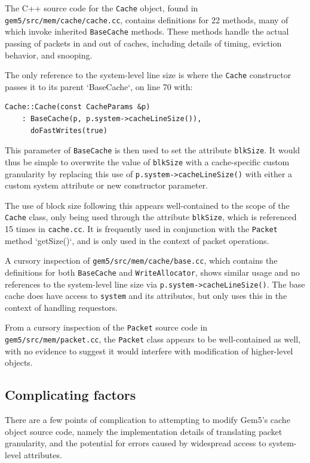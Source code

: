 \documentclass[12pt,twoside]{reedthesis}
\begin{document}
	The C++ source code for the \verb`Cache` object, found in \verb`gem5/src/mem/cache/cache.cc`, contains definitions for 22 methods, many of which invoke inherited \verb`BaseCache` methods. These methods handle the actual passing of packets in and out of caches, including details of timing, eviction behavior, and snooping.

	The only reference to the system-level line size is where the \verb`Cache` constructor passes it to its parent `BaseCache`, on line 70 with:
	\begin{verbatim}
Cache::Cache(const CacheParams &p)
    : BaseCache(p, p.system->cacheLineSize()),
      doFastWrites(true)
	\end{verbatim}
	This parameter of \verb`BaseCache` is then used to set the attribute \verb`blkSize`. It would thus be simple to overwrite the value of \verb`blkSize` with a cache-specific custom granularity by replacing this use of \verb`p.system->cacheLineSize()` with either a custom system attribute or new constructor parameter.

	The use of block size following this appears well-contained to the scope of the \verb`Cache` class, only being used through the attribute \verb`blkSize`, which is referenced 15 times in \verb`cache.cc`. It is frequently used in conjunction with the \verb`Packet` method `getSize()`, and is only used in the context of packet operations.
	
	A cursory inspection of \verb`gem5/src/mem/cache/base.cc`, which contains the definitions for both \verb`BaseCache` and \verb`WriteAllocator`, shows similar usage and no references to the system-level line size via \verb`p.system->cacheLineSize()`. The base cache does have access to \verb`system` and its attributes, but only uses this in the context of handling requestors.
	
	From a cursory inspection of the \verb`Packet` source code in \verb`gem5/src/mem/packet.cc`, the \verb`Packet` class appears to be well-contained as well, with no evidence to suggest it would interfere with modification of higher-level objects.

	\subsection*{Complicating factors}

	There are a few points of complication to attempting to modify Gem5's cache object source code, namely the implementation details of translating packet granularity, and the potential for errors caused by widespread access to system-level attributes.
	
\end{document}
